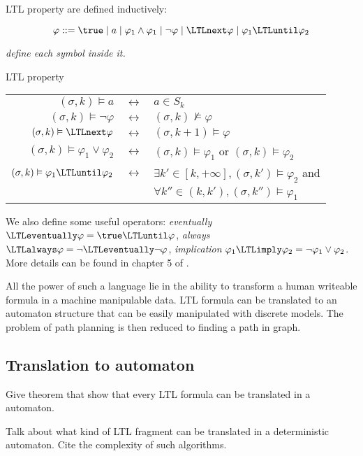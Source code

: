 LTL property are defined inductively:

$$ \varphi ::= 
\true \mid 
a \mid 
\varphi_1 \land \varphi_1 \mid
\lnot \varphi \mid
\LTLnext \varphi \mid
\varphi_1 \LTLuntil \varphi_2$$

\textit{define each symbol inside it.}

\begin{nameddef}{LTL property}
\begin{tabular}[b]{rcl}
$(\sigma,k) \vDash a$ & $\leftrightarrow$ & $a \in S_k$\\
$(\sigma,k) \vDash \lnot \varphi$ & $\leftrightarrow$ &  $(\sigma,k) \nvDash  \varphi$ \\
$(\sigma,k) \vDash \LTLnext \varphi$ & $\leftrightarrow$ &  $(\sigma,k+1) \vDash  \varphi$ \\
$(\sigma,k) \vDash \varphi_1 \lor \varphi_2$ & $\leftrightarrow$ &  $(\sigma,k) \vDash  \varphi_1$ or $(\sigma,k) \vDash  \varphi_2$ \\
$(\sigma,k) \vDash \varphi_1 \LTLuntil \varphi_2$ & $\leftrightarrow$ &  $\exists k' \in \left [k, +\infty \right ] , (\sigma,k') \vDash \varphi_2$ and \\
& & $\forall k'' \in (k,k'), (\sigma,k'') \vDash \varphi_1$ \\
\end{tabular}
\end{nameddef}

We also define some useful operators: \textit{eventually} $\LTLeventually \varphi = \true \LTLuntil \varphi$, \textit{always} $\LTLalways \varphi = \lnot \LTLeventually \lnot \varphi$, \textit{implication} $\varphi_1 \LTLimply \varphi_2 = \lnot \varphi_1 \lor \varphi_2$.
More details can be found in chapter 5 of \cite{principlemodelchecking}.

All the power of such a language lie in the ability to transform a human writeable formula in a machine manipulable data. LTL formula can be translated to an automaton structure that can be easily manipulated with discrete models. The problem of path planning is then reduced to finding a path in graph.

\subsection{Translation to \buchi{} automaton}

Give theorem that show that every LTL formula can be translated in a \buchi{} automaton.

Talk about what kind of LTL fragment can be translated in a deterministic \buchi{} automaton.
Cite the complexity of such algorithms.

